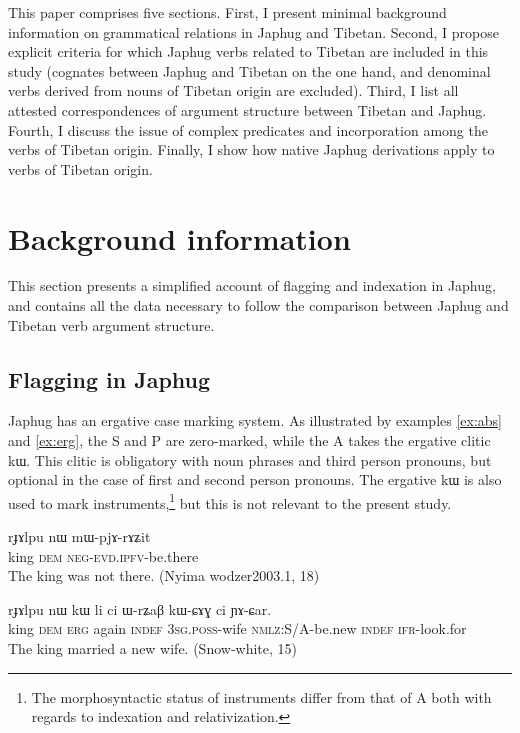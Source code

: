 \documentclass[oldfontcommands,oneside,a4paper,11pt]{article}
\newcommand{\ipa}[1]{{\phon \mbox{#1}}} %
\begin{document}
This paper comprises five sections. First, I present minimal background information on grammatical relations in Japhug and Tibetan. Second, I propose explicit criteria for which Japhug verbs related to Tibetan are included in this study (cognates between Japhug and Tibetan on the one hand, and denominal verbs derived from nouns of Tibetan origin are excluded). Third, I list all attested correspondences of argument structure between Tibetan and Japhug. Fourth, I discuss the issue of complex predicates and incorporation among the verbs of Tibetan origin. Finally, I show how native Japhug derivations apply to verbs of Tibetan origin.

\section{Background information}
This section presents a simplified account of flagging and indexation in Japhug, and contains all the data necessary to follow the comparison between Japhug and Tibetan verb argument structure.

\subsection{Flagging in Japhug}
Japhug has an ergative case marking system. As illustrated by examples \ref{ex:abs} and \ref{ex:erg}, the S and P are zero-marked, while the A takes the ergative clitic \ipa{kɯ}. This clitic is obligatory with noun phrases and third person pronouns, but optional in the case of first and second person pronouns. The ergative \ipa{kɯ} is also used to mark instruments,\footnote{The morphosyntactic status of instruments differ from that of A both with regards to indexation and relativization.} but this is not relevant to the present study.

 \begin{exe}
\ex \label{ex:abs}
\gll
\ipa{rɟɤlpu}  	\ipa{nɯ}  	\ipa{mɯ-pjɤ-rɤʑit}  \\
king \textsc{dem} \textsc{neg-evd.ipfv}-be.there \\
 \glt The king was not there. (Nyima wodzer2003.1, 18)
\end{exe}

 \begin{exe}
\ex \label{ex:erg}
\gll 
\ipa{rɟɤlpu}  	\ipa{nɯ}  	\ipa{kɯ}  	\ipa{li}  	\ipa{ci}  	\ipa{ɯ-rʑaβ}  	\ipa{kɯ-ɕɤɣ}  	\ipa{ci}  	\ipa{ɲɤ-ɕar.}  	 \\
king \textsc{dem} \textsc{erg} again \textsc{indef} \textsc{3sg.poss}-wife \textsc{nmlz}:S/A-be.new \textsc{indef}  \textsc{ifr}-look.for \\
\glt The king married a new wife. (Snow-white, 15)
\end{exe}
\end{document}

